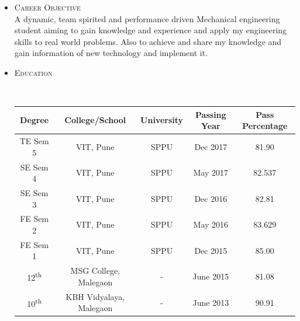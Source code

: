 \documentclass[10pt]{article}
\begin{document}
\begin{itemize}
	\bigskip
	\item  \LARGE{\textsc{Career Objective}} \\
	\small{A dynamic, team spirited and performance driven Mechanical engineering student aiming to gain knowledge and experience and apply my engineering skills to real world problems. Also to achieve and share my knowledge and gain information of new technology and implement it.} \\


\bigskip
\item \begin{LARGE}
	\textsc{Education}
\end{LARGE} \\

\begin{tabular}{||c|c|c|c|c||}
	\hline
	
	Degree & College/School & University & Passing Year & Pass Percentage \\ 
	\hline
	TE Sem 5 & VIT, Pune & SPPU & Dec 2017 & 81.90\\\hline
	SE Sem 4 & VIT, Pune & SPPU & May 2017 & 82.537\\\hline
	SE Sem 3 & VIT, Pune & SPPU & Dec 2016 & 82.81\\\hline
	FE Sem 2 & VIT, Pune & SPPU & May 2016 & 83.629\\\hline
	FE Sem 1 & VIT, Pune & SPPU & Dec 2015 & 85.00\\\hline
	12\textsuperscript{th} & MSG College, Malegaon & - & June 2015 & 81.08 \\
	\hline10\textsuperscript{th} & KBH Vidyalaya, Malegaon & - & June 2013 & 90.91 \\\hline
\end{tabular}


\end{itemize}
\end{document}
